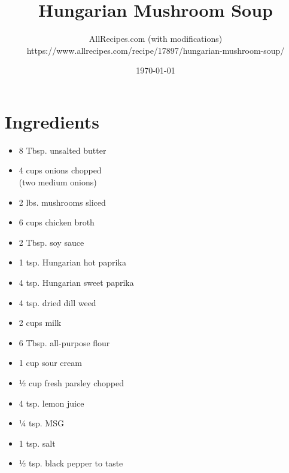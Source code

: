 \documentclass[11pt,letterpaper]{article}
\title{Hungarian Mushroom Soup}
\author{
  AllRecipes.com (with modifications) \\
  \small{ https://www.allrecipes.com/recipe/17897/hungarian-mushroom-soup/ }
}
\date{\today}
\begin{document}
\maketitle

\section*{Ingredients}
\begin{multicols}{2}
    \begin{itemize}
        \item 8 Tbsp. unsalted butter
        \item 4 cups onions chopped \\ (two medium onions)
        \item 2 lbs. mushrooms sliced
        \item 6 cups chicken broth
        \item 2 Tbsp. soy sauce
        \item 1 tsp. Hungarian hot paprika
        \item 4 tsp. Hungarian sweet paprika
        \item 4 tsp. dried dill weed
    \end{itemize}
    \columnbreak
    \begin{itemize}
        \item 2 cups milk
        \item 6 Tbsp. all-purpose flour
        \item 1 cup sour cream
        \item ½ cup fresh parsley chopped 
        \item 4 tsp. lemon juice
        \item ¼ tsp. MSG
        \item 1 tsp. salt
        \item ½ tsp. black pepper to taste
    \end{itemize}
\end{multicols}
\end{document}
